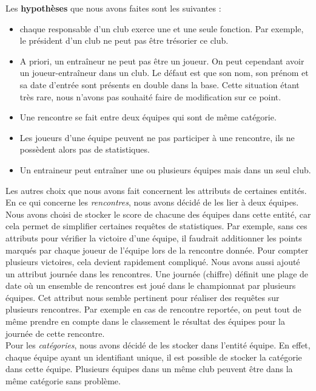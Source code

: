 \documentclass[a4paper,12pt]{article}
\begin{document}
Les \textbf{hypothèses} que nous avons faites sont les suivantes :
\begin{itemize}
\item chaque responsable d'un club exerce une et une seule fonction. Par exemple, le président d'un club ne peut pas être trésorier ce club.
\item A priori, un entraîneur ne peut pas être un joueur. On peut cependant avoir un joueur-entraîneur dans un club. Le défaut est que son nom, son prénom et sa date d'entrée sont présents en double dans la base. Cette situation étant très rare, nous n'avons pas souhaité faire de modification sur ce point.
\item Une rencontre se fait entre deux équipes qui sont de même catégorie.
\item Les joueurs d'une équipe peuvent ne pas participer à une rencontre, ils ne possèdent alors pas de statistiques.
\item Un entraineur peut entraîner une ou plusieurs équipes mais dans un seul club.
\end{itemize}
\vspace{0.2cm}
Les autres choix que nous avons fait concernent les attributs de certaines entités.\\

En ce qui concerne les \emph{rencontres}, nous avons décidé de les lier à deux équipes. Nous avons choisi de stocker le score de chacune des équipes dans cette entité, car cela permet de simplifier certaines requêtes de statistiques. Par exemple, sans ces attributs pour vérifier la victoire d'une équipe, il faudrait additionner les points marqués par chaque joueur de l'équipe lors de la rencontre donnée. Pour compter plusieurs victoires, cela devient rapidement compliqué. Nous avons aussi ajouté un attribut journée dans les rencontres. Une journée (chiffre) définit une plage de date où un ensemble de rencontres est joué dans le championnat par plusieurs équipes. Cet attribut nous semble pertinent pour réaliser des requêtes sur plusieurs rencontres. Par exemple en cas de rencontre reportée, on peut tout de même prendre en compte dans le classement le résultat des équipes pour la journée de cette rencontre. \\

Pour les \emph{catégories}, nous avons décidé de les stocker dans l'entité équipe. En effet, chaque équipe ayant un identifiant unique, il est possible de stocker la catégorie dans cette équipe. Plusieurs équipes dans un même club peuvent être dans la même catégorie sans problème.\\
\end{document}
